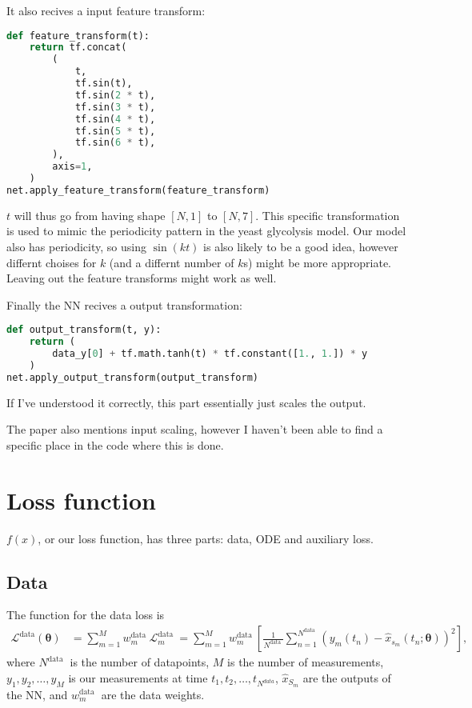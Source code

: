 \documentclass[a4paper]{article}
\begin{document}
It also recives a input feature transform:
\begin{lstlisting}[language=python]
def feature_transform(t):
	return tf.concat(
		(
			t,
			tf.sin(t),
			tf.sin(2 * t),
			tf.sin(3 * t),
			tf.sin(4 * t),
			tf.sin(5 * t),
			tf.sin(6 * t),
		),
		axis=1,
	)
net.apply_feature_transform(feature_transform)
\end{lstlisting}
$t$ will thus go from having shape $[N, 1]$ to $[N, 7]$. 
This specific transformation is used to mimic the periodicity pattern in the yeast glycolysis model. Our model also has periodicity, so using $\sin(kt)$ is also likely to be a good idea, however differnt choises for $k$ (and a differnt number of $k$s) might be more appropriate. Leaving out the feature transforms might work as well. 

Finally the NN recives a output transformation:
\begin{lstlisting}[language=python]
def output_transform(t, y):
	return (
		data_y[0] + tf.math.tanh(t) * tf.constant([1., 1.]) * y
	)
net.apply_output_transform(output_transform)
\end{lstlisting}
If I've understood it correctly, this part essentially just scales the output.

The paper also mentions input scaling, however I haven't been able to find a specific place in the code where this is done.




\section{Loss function}

$f(x)$, or our loss function, has three parts: data, ODE and auxiliary loss. 

\subsection{Data}

The function for the data loss is
\begin{align}
\mathcal{L}^{ \text{data}}(\boldsymbol{\theta}) &= \sum_{m=1}^{M} w_{m}^{\text {data }} \mathcal{L}_{m}^{\text {data }}=\sum_{m=1}^{M} w_{m}^{\text {data }}\left[\frac{1}{N^{\text {data }}} \sum_{n=1}^{N^{\text {data }}}\left(y_{m}\left(t_{n}\right)-\hat{x}_{s_{m}}\left(t_{n} ; \boldsymbol{\theta}\right)\right)^{2}\right],
\end{align}
where $N^{\text {data }}$ is the number of datapoints, $M$ is the number of measurements, $y_{1}, y_{2}, \ldots, y_{M}$ is our measurements at time $t_{1}, t_{2}, \ldots, t_{N^{d a t a}}$, $\hat{x}_{S_m}$ are the outputs of the NN, and $w_{m}^{\text {data }}$ are the data weights. 
\end{document}
